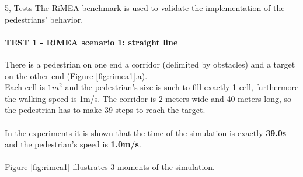 \documentclass[10pt,a4paper]{article}
\begin{document}
\begin{task}{5, Tests}
The RiMEA \cite{RiMEA} benchmark is used to validate the implementation of the pedestrians' behavior.

\paragraph{TEST 1 - RiMEA scenario 1: straight line}
There is a pedestrian on one end a corridor (delimited by obstacles) and a target on the other end (\hyperref[fig:rimea1]{Figure \ref{fig:rimea1}.a}).\\
Each cell is $1m^2$ and the pedestrian's size is such to fill exactly 1 cell, furthermore the walking speed is 1m/s.
The corridor is 2 meters wide and 40 meters long, so the pedestrian has to make 39 steps to reach the target.\\\\
In the experiments it is shown that the time of the simulation is exactly \textbf{39.0s} and the pedestrian's speed is \textbf{1.0m/s}.\\\\
\hyperref[fig:rimea1]{Figure \ref{fig:rimea1}} illustrates 3 moments of the simulation.


\end{task}
\end{document}
